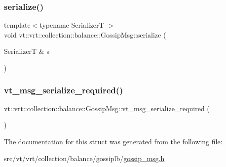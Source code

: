 \subsubsection{\texorpdfstring{serialize()}{serialize()}}
{\footnotesize\ttfamily template$<$typename SerializerT $>$ \\
void vt\+::vrt\+::collection\+::balance\+::\+Gossip\+Msg\+::serialize (\begin{DoxyParamCaption}\item[{SerializerT \&}]{s }\end{DoxyParamCaption})\hspace{0.3cm}{\ttfamily [inline]}}

\mbox{\label{structvt_1_1vrt_1_1collection_1_1balance_1_1_gossip_msg_adf3c2f55e4349f8d5f497a0f88f047cf}} 
\subsubsection{\texorpdfstring{vt\+\_\+msg\+\_\+serialize\+\_\+required()}{vt\_msg\_serialize\_required()}}
{\footnotesize\ttfamily vt\+::vrt\+::collection\+::balance\+::\+Gossip\+Msg\+::vt\+\_\+msg\+\_\+serialize\+\_\+required (\begin{DoxyParamCaption}{ }\end{DoxyParamCaption})}



The documentation for this struct was generated from the following file\+:\begin{DoxyCompactItemize}
\item 
src/vt/vrt/collection/balance/gossiplb/\hyperlink{gossip__msg_8h}{gossip\+\_\+msg.\+h}\end{DoxyCompactItemize}
